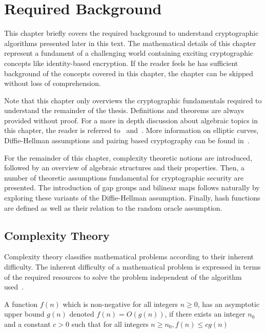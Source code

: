 \chapter{Required Background}
\label{cha:1}
This chapter briefly covers the required background to understand cryptographic algorithms presented later in this text. The mathematical details of this chapter represent a fundament of a challenging world containing exciting cryptographic concepts like identity-based encryption. If the reader feels he has sufficient background of the concepts covered in this chapter, the chapter can be skipped without loss of comprehension.

Note that this chapter only overviews the cryptographic fundamentals required to understand the remainder of the thesis. Definitions and theorems are always provided without proof. For a more in depth discussion about algebraic topics in this chapter, the reader is referred to~\cite{book:handbook_of_applied_cryptography} and~\cite{book:survey_of_modern_algebra}. More information on elliptic curves, Diffie-Hellman assumptions and pairing based cryptography can be found in~\cite{thesis:Maas04}.

For the remainder of this chapter, complexity theoretic notions are introduced, followed by an overview of algebraic structures and their properties. Then, a number of theoretic assumptions fundamental for cryptographic security are presented. The introduction of gap groups and bilinear maps follows naturally by exploring these variants of the Diffie-Hellman assumption. Finally, hash functions are defined as well as their relation to the random oracle assumption.

\section{Complexity Theory}
Complexity theory classifies mathematical problems according to their inherent difficulty. The inherent difficulty of a mathematical problem is expressed in terms of the required resources to solve the problem independent of the algorithm used~\cite{book:handbook_of_applied_cryptography}.

\begin{defn}
\label{def:asymptotic_upper_bound}
 A function $f \left( n \right)$ which is non-negative for all integers $n \geq 0$, has an asymptotic upper bound $g \left( n \right)$ denoted $f \left( n \right) = O \left( g \left( n \right) \right)$, if there exists an integer $n_0$ and a constant $c > 0$ such that for all integers $n \geq n_0, f \left( n \right) \leq c g \left( n \right)$
\end{defn}

